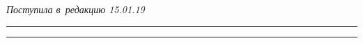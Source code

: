 \vspace*{-3pt}





\hfill{\small\textit{Поступила в~редакцию 15.01.19}}





\vspace*{12pt}




















\hrule





\vspace*{2pt}





\hrule










\def\tit{COMPARATIVE ANALYSIS OF~PERFORMANCE MEASURES FOR~A~WIRELESS 


MACHINE-TO-MACHINE NETWORK MODEL OPERATING WITHIN~TWO RADIO RESOURCE MANAGEMENT POLICIES}








\def\titkol{Comparative analysis of performance measures for a~wireless 


machine-to-machine network model} %





\def\aut{E.\,V.~Markova$^1$, A.\,A.~Golskaia$^1$, I.\,L.~Dzantiev$^1$, 


I.\,A.~Gudkova$^{1,2}$, and~S.\,Ya.~Shorgin$^{1,2}$}





